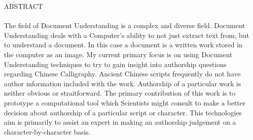 ABSTRACT\\
\\
The field of Document Understanding is a complex and diverse field. Document Understanding deals with a Computer's ability to not just extract text from, but to understand a document. In this case a document is a written work stored in the computer as an image. My current primary focus is on using Document Understanding techniques to try to gain insight into authorship questions regarding Chinese Calligraphy. Ancient Chinese scripts frequently do not have author information included with the work. Authorship of a particular work is neither obvious or straitforward. The primary contribution of this work is to prototype a computational tool which Scientists might consult to make a better decision about authorship of a particular script or character. This technologies aim is primarily to assist an expert in making an authorship judgement on a character-by-character basis.

\newpage
